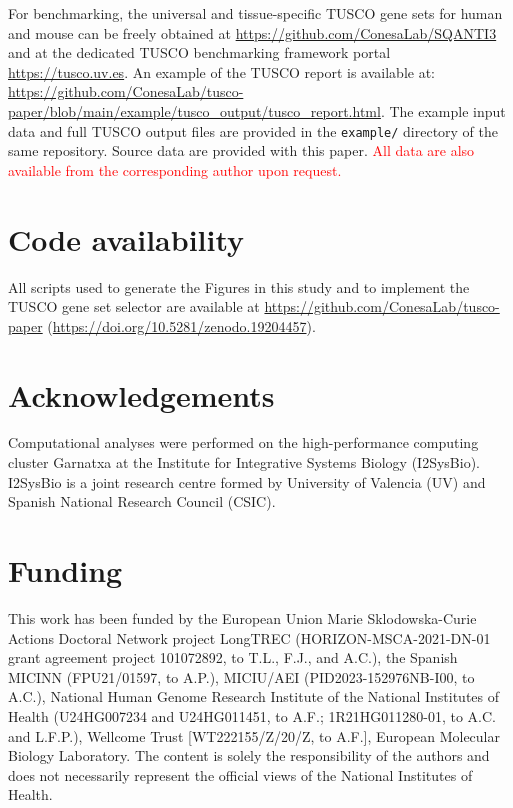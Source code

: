 \documentclass[pdflatex,sn-nature]{sn-jnl}%
\newcommand{\tuscoGeneSet}{TUSCO gene set}
\newcommand{\tuscoBenchmarkingFramework}{TUSCO benchmarking framework}
\begin{document}
For benchmarking, the universal and tissue-specific \tuscoGeneSet{}s for human and mouse can be freely obtained at \url{https://github.com/ConesaLab/SQANTI3} and at the dedicated \tuscoBenchmarkingFramework{} portal \url{https://tusco.uv.es}. An example of the TUSCO report is available at: \url{https://github.com/ConesaLab/tusco-paper/blob/main/example/tusco_output/tusco_report.html}. The example input data and full TUSCO output files are provided in the \texttt{example/} directory of the same repository. Source data are provided with this paper. \textcolor{red}{All data are also available from the corresponding author upon request.}


\section{Code availability}

All scripts used to generate the Figures in this study and to implement the \tuscoGeneSet{} selector are available at \url{https://github.com/ConesaLab/tusco-paper} (\url{https://doi.org/10.5281/zenodo.19204457}).


\backmatter




\section{Acknowledgements}

Computational analyses were performed on the high-performance computing cluster Garnatxa at the Institute for Integrative Systems Biology (I2SysBio). I2SysBio is a joint research centre formed by University of Valencia (UV) and Spanish National Research Council (CSIC).

\section{Funding}

This work has been funded by the European Union Marie Sklodowska-Curie Actions Doctoral Network project LongTREC (HORIZON-MSCA-2021-DN-01 grant agreement project 101072892, to T.L., F.J., and A.C.), the Spanish MICINN (FPU21/01597, to A.P.), MICIU/AEI (PID2023-152976NB-I00, to A.C.), National Human Genome Research Institute of the National Institutes of Health (U24HG007234 and U24HG011451, to A.F.; 1R21HG011280-01, to A.C. and L.F.P.), Wellcome Trust [WT222155/Z/20/Z, to A.F.], European Molecular Biology Laboratory. The content is solely the responsibility of the authors and does not necessarily represent the official views of the National Institutes of Health.
\end{document}

